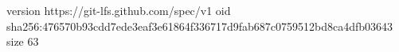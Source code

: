 version https://git-lfs.github.com/spec/v1
oid sha256:476570b93cdd7ede3eaf3e61864f336717d9fab687c0759512bd8ca4dfb03643
size 63
